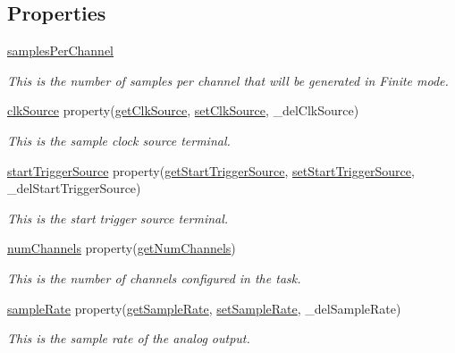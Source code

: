 \subsection*{Properties}
\begin{DoxyCompactItemize}
\item 
\hyperlink{class_chassis_8git_1_1_analog_output_1_1_analog_output_a8084800d7b837e849ef8d28399734c8d}{samples\-Per\-Channel}
\begin{DoxyCompactList}\small\item\em This is the number of samples per channel that will be generated in Finite mode. \end{DoxyCompactList}\item 
\hyperlink{class_chassis_8git_1_1_analog_output_1_1_analog_output_a37ac13275c8e900e56d9209f585463d7}{clk\-Source} property(\hyperlink{class_chassis_8git_1_1_analog_output_1_1_analog_output_a1ba576d85e63c6c3aac5ad6fe899ee91}{get\-Clk\-Source}, \hyperlink{class_chassis_8git_1_1_analog_output_1_1_analog_output_a67c1392eefe5fc6e243a0354f5c79c35}{set\-Clk\-Source}, \-\_\-del\-Clk\-Source)
\begin{DoxyCompactList}\small\item\em This is the sample clock source terminal. \end{DoxyCompactList}\item 
\hyperlink{class_chassis_8git_1_1_analog_output_1_1_analog_output_a77277af6c02de05964114f91af9fab28}{start\-Trigger\-Source} property(\hyperlink{class_chassis_8git_1_1_analog_output_1_1_analog_output_ae0e482ce7f377942d8aa1f0c17e25e4d}{get\-Start\-Trigger\-Source}, \hyperlink{class_chassis_8git_1_1_analog_output_1_1_analog_output_a0c98b6dc3f661278349fa23bfa8c7e87}{set\-Start\-Trigger\-Source}, \-\_\-del\-Start\-Trigger\-Source)
\begin{DoxyCompactList}\small\item\em This is the start trigger source terminal. \end{DoxyCompactList}\item 
\hyperlink{class_chassis_8git_1_1_analog_output_1_1_analog_output_a3de173dc3a4ea7afe4e12c95e4a99269}{num\-Channels} property(\hyperlink{class_chassis_8git_1_1_analog_output_1_1_analog_output_a58db66325e0a66d02e31ca78ddb7f6ee}{get\-Num\-Channels})
\begin{DoxyCompactList}\small\item\em This is the number of channels configured in the task. \end{DoxyCompactList}\item 
\hyperlink{class_chassis_8git_1_1_analog_output_1_1_analog_output_ad2431ae041aef61c1bd11893a074d0a7}{sample\-Rate} property(\hyperlink{class_chassis_8git_1_1_analog_output_1_1_analog_output_a40bd6b48848f454a0e86bab3d637da0a}{get\-Sample\-Rate}, \hyperlink{class_chassis_8git_1_1_analog_output_1_1_analog_output_a57cd627a46ed340e5c6a2b8926f6e812}{set\-Sample\-Rate}, \-\_\-del\-Sample\-Rate)
\begin{DoxyCompactList}\small\item\em This is the sample rate of the analog output. \end{DoxyCompactList}\end{DoxyCompactItemize}


